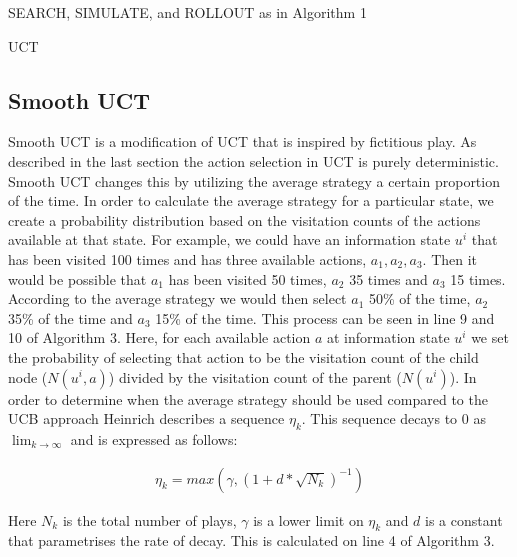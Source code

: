 \begin{algorithm}[H]
    \DontPrintSemicolon
    \LinesNumbered
    SEARCH, SIMULATE, and ROLLOUT as in Algorithm 1\;
    \caption{UCT}
\end{algorithm}

\subsection{Smooth UCT}\label{subsec:smoothUCT}
Smooth UCT is a modification of UCT that is inspired by fictitious play\citep{heinrich2017reinforcement}.
As described in the last section the action selection in UCT is purely deterministic.
Smooth UCT changes this by utilizing the average strategy a certain proportion of the time.
In order to calculate the average strategy for a particular state, we create a
probability distribution based on the visitation counts of the actions
available at that state.
For example, we could have an information state $u^i$ that has been visited 100 times
and has three available actions, $a_1, a_2, a_3$.
Then it would be possible that $a_1$ has been visited 50 times, $a_2$ 35 times
and $a_3$ 15 times.
According to the average strategy we would then select $a_1$ 50\% of the time,
$a_2$ 35\% of the time and $a_3$ 15\% of the time.
This process can be seen in line 9 and 10 of Algorithm 3.
Here, for each available action $a$ at information state $u^i$ we set the
probability of selecting that action to be the visitation count of the child node ($N(u^i,a)$)
divided by the visitation count of the parent ($N(u^i)$).
In order to determine when the average strategy should be used compared to the
UCB approach Heinrich describes a sequence $\eta_k$.
This sequence decays to 0 as $\lim_{k \to \infty}$ and is expressed as follows:

\begin{align}
\eta_k = max(\gamma, (1 + d * \sqrt{N_k})^{-1})
\end{align}

Here $N_k$ is the total number of plays, $\gamma$ is a lower limit on $\eta_k$
and $d$ is a constant that parametrises the rate of decay.
This is calculated on line 4 of Algorithm 3.

